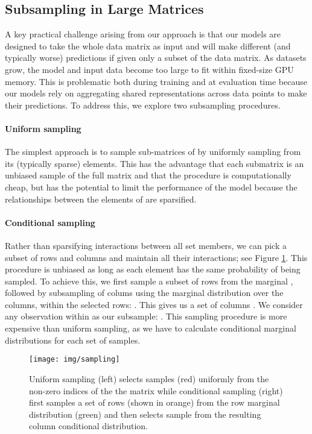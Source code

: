 \documentclass{article}
\theoremstyle{definition}
\begin{document}
\subsection{Subsampling in Large Matrices}\label{sec:subsampling}
A key practical challenge arising from our approach is that our models are designed to take the whole data matrix  as input and will make different (and typically worse) predictions if given only a subset of the data matrix. As datasets grow, the model and input data become too large to fit within fixed-size GPU memory. This is problematic both during training and at evaluation time because our models rely on aggregating shared representations across data points to make their predictions. To address this, we explore two subsampling procedures. 
\vspace{-.6em minus .3em}\paragraph{Uniform sampling} The simplest approach is to sample sub-matrices of  by uniformly sampling from its (typically sparse) elements. 
This has the advantage that each submatrix is an unbiased sample of the full matrix and that the procedure is computationally cheap, but has the potential to limit the performance of the model because the relationships between the elements of  are sparsified.

\vspace{-.6em minus .3em}\paragraph{Conditional sampling} Rather than sparsifying interactions between all set members, we can pick a subset of rows and columns and maintain all their interactions; see Figure \ref{fig:sampling}. This procedure is unbiased as long as each element  has the same probability of being sampled.
To achieve this, we first sample a subset of rows  from the marginal , followed by subsampling of colums using the marginal distribution over the columns, within the selected rows: . This gives us a set of columns . We consider any observation within  as our subsample: . 
This sampling procedure is more expensive than uniform sampling, as we have to calculate 
conditional marginal distributions for each set of samples.

\begin{figure}[h]\centering
\texttt{[image: img/sampling]}
\caption{Uniform sampling (left) selects samples (red) uniformly from the non-zero indices of the the matrix  while conditional sampling (right) first samples a set of rows (shown in orange) from the row marginal distribution (green) and then selects sample from the resulting column conditional distribution.}
\label{fig:sampling}
\end{figure}
\end{document}

